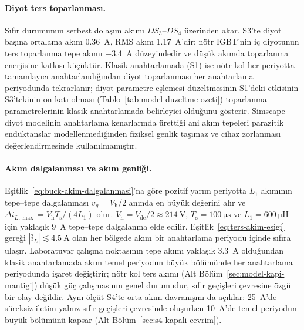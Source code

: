 \paragraph{Diyot ters toparlanması.} Sıfır durumunun serbest dolaşım akımı $DS_3$--$DS_4$ üzerinden akar. S3'te diyot başına ortalama akım \SI{0.36}{\ampere}, RMS akım \SI{1.17}{\ampere}'dir; nötr IGBT'nin iç diyotunun ters toparlanma tepe akımı \SI{-3.4}{\ampere} düzeyindedir ve düşük akımda toparlanma enerjisine katkısı küçüktür. Klasik anahtarlamada (S1) ise nötr kol her periyotta tamamlayıcı anahtarlandığından diyot toparlanması her anahtarlama periyodunda tekrarlanır; diyot parametre eşlemesi düzeltmesinin S1'deki etkisinin S3'tekinin on katı olması (Tablo~\ref{tab:model-duzeltme-ozeti}) toparlanma parametrelerinin klasik anahtarlamada belirleyici olduğunu gösterir. Simscape diyot modelinin anahtarlama kenarlarında ürettiği ani akım tepeleri parazitik endüktanslar modellenmediğinden fiziksel genlik taşımaz ve cihaz zorlanması değerlendirmesinde kullanılmamıştır.

\paragraph{Akım dalgalanması ve akım genliği.} Eşitlik~\eqref{eq:buck-akim-dalgalanmasi}'na göre pozitif yarım periyotta $L_1$ akımının tepe--tepe dalgalanması $v_g=V_{\mathrm{h}}/2$ anında en büyük değerini alır ve $\Delta i_{L,\max}=V_{\mathrm{h}}T_{\mathrm{s}}/(4L_1)$ olur. $V_{\mathrm{h}}=V_{\mathrm{dc}}/2\approx\SI{214}{\volt}$, $T_{\mathrm{s}}=\SI{100}{\micro\second}$ ve $L_1=\SI{600}{\micro\henry}$ için yaklaşık \SI{9}{\ampere} tepe--tepe dalgalanma elde edilir. Eşitlik~\eqref{eq:ters-akim-esigi} gereği $|\bar i_L|\lesssim\SI{4.5}{\ampere}$ olan her bölgede akım bir anahtarlama periyodu içinde sıfıra ulaşır. Laboratuvar çalışma noktasının tepe akımı yaklaşık \SI{3.3}{\ampere} olduğundan klasik anahtarlamada akım temel periyodun büyük bölümünde her anahtarlama periyodunda işaret değiştirir; nötr kol ters akımı (Alt Bölüm~\ref{sec:model-kapi-mantigi}) düşük güç çalışmasının genel durumudur, sıfır geçişleri çevresine özgü bir olay değildir. Aynı ölçüt S4'te orta akım davranışını da açıklar: \SI{25}{\ampere}'de süreksiz iletim yalnız sıfır geçişleri çevresinde oluşurken \SI{10}{\ampere}'de temel periyodun büyük bölümünü kapsar (Alt Bölüm~\ref{sec:s4-kapali-cevrim}).

